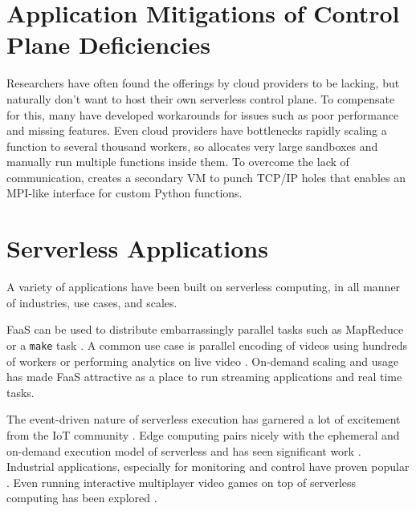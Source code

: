 \section{Application Mitigations of Control Plane Deficiencies}

Researchers have often found the offerings by cloud providers to be lacking, but naturally don't want to host their own serverless control plane.
To compensate for this, many have developed workarounds for issues such as poor performance and missing features.
Even cloud providers have bottlenecks rapidly scaling a function to several thousand workers, so \cite{basu2023propack} allocates very large sandboxes and manually run multiple functions inside them.
To overcome the lack of communication, \cite{copik2023fmi} creates a secondary VM to punch TCP/IP holes that enables an MPI-like interface for custom Python functions.


\section{Serverless Applications}
\label{sec:serverless-apps}

A variety of applications have been built on serverless computing, in all manner of industries, use cases, and scales.

FaaS can be used to distribute embarrassingly parallel tasks such as MapReduce \cite{jonas2017occupy} or a \texttt{make} task \cite{fouladi2019laptop}.
A common use case is parallel encoding of videos using hundreds of workers \cite{ao2018sprocket, zhang2019video} or performing analytics on live video \cite{romero2021llama, risco2021gpu}.
On-demand scaling and usage has made FaaS attractive as a place to run streaming applications \cite{konstantoudakis2022serverless,wang2021wearmask,elordi2021demand} and real time \cite{yan2016building,anand2019low} tasks.

The event-driven nature of serverless execution has garnered a lot of excitement from the IoT community \cite{benedetti2021experimental,trilles2020iot,hu2020hivemind,persson2017kappa}.
Edge computing pairs nicely with the ephemeral and on-demand execution model of serverless and has seen significant work \cite{cicconetti2020decentralized,cheng2019fog,wang2020supporting}.
Industrial applications, especially for monitoring and control have proven popular \cite{hussain2019serverless,mete2021implementation,zhang2021serverless}.
Even running interactive multiplayer video games on top of serverless computing has been explored \cite{donkervlietservo}.


